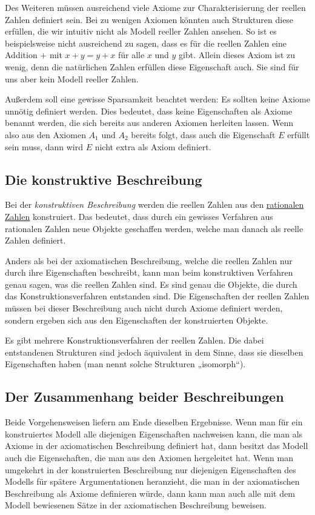 \documentclass[fontsize=9pt,
               parskip=half-,
               DIV=14,
               listof=chapterentry,
               tocflat]{scrbook}
\begin{document}
Des Weiteren müssen ausreichend viele Axiome zur Charakterisierung der reellen Zahlen definiert sein. Bei zu wenigen Axiomen könnten auch Strukturen diese erfüllen, die wir intuitiv nicht als Modell reeller Zahlen ansehen. So ist es beispielsweise nicht ausreichend zu sagen, dass es für die reellen Zahlen eine Addition $+$ mit $x+y=y+x$ für alle $x$ und $y$ gibt. Allein dieses Axiom ist zu wenig, denn die natürlichen Zahlen erfüllen diese Eigenschaft auch. Sie sind für uns aber kein Modell reeller Zahlen.

Außerdem soll eine gewisse Sparsamkeit beachtet werden: Es sollten keine Axiome unnötig definiert werden. Dies bedeutet, dass keine Eigenschaften als Axiome benannt werden, die sich bereits aus anderen Axiomen herleiten lassen. Wenn also aus den Axiomen $A_{1}$ und $A_{2}$ bereits folgt, dass auch die Eigenschaft $E$ erfüllt sein muss, dann wird $E$ nicht extra als Axiom definiert.

\subsection{Die konstruktive Beschreibung}

Bei der \emph{konstruktiven Beschreibung} werden die reellen Zahlen aus den \href{https://de.wikipedia.org/wiki/Rationale\%20Zahl}
{rationalen Zahlen} konstruiert. Das bedeutet, dass durch ein gewisses Verfahren aus rationalen Zahlen neue Objekte geschaffen werden, welche man danach als reelle Zahlen definiert.

Anders als bei der axiomatischen Beschreibung, welche die reellen Zahlen nur durch ihre Eigenschaften beschreibt, kann man beim konstruktiven Verfahren genau sagen, was die reellen Zahlen sind. Es sind genau die Objekte, die durch das Konstruktionsverfahren entstanden sind. Die Eigenschaften der reellen Zahlen müssen bei dieser Beschreibung auch nicht durch Axiome definiert werden, sondern ergeben sich aus den Eigenschaften der konstruierten Objekte.

Es gibt mehrere Konstruktionsverfahren der reellen Zahlen. Die dabei entstandenen Strukturen sind jedoch äquivalent in dem Sinne, dass sie dieselben Eigenschaften haben (man nennt solche Strukturen „isomorph“).

\subsection{Der Zusammenhang beider Beschreibungen}

Beide Vorgehensweisen liefern am Ende dieselben Ergebnisse. Wenn man für ein konstruiertes Modell alle diejenigen Eigenschaften nachweisen kann, die man als Axiome in der axiomatischen Beschreibung definiert hat, dann besitzt das Modell auch die Eigenschaften, die man aus den Axiomen hergeleitet hat. Wenn man umgekehrt in der konstruierten Beschreibung nur diejenigen Eigenschaften des Modells für spätere Argumentationen heranzieht, die man in der axiomatischen Beschreibung als Axiome definieren würde, dann kann man auch alle mit dem Modell bewiesenen Sätze in der axiomatischen Beschreibung beweisen.
\end{document}
